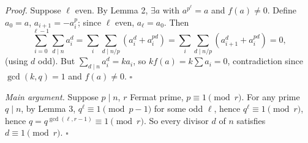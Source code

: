 \documentclass{article}
\begin{document}
\emph{Proof.} Suppose $\ell$ even. By Lemma 2, $\exists a$ with $a^{p^\ell} = a$ and $f(a) \neq 0$. Define $a_0 = a$, $a_{i+1} = -a_i^p$; since $\ell$ even, $a_\ell = a_0$. Then
\[
\sum_{i=0}^{\ell-1} \sum_{d \mid n} a_i^d = \sum_i \sum_{d \mid n/p} (a_i^d + a_i^{pd}) = \sum_i \sum_{d \mid n/p} (a_{i+1}^d + a_i^{pd}) = 0,
\]
(using $d$ odd). But $\sum_{d \mid n} a_i^d = k a_i$, so $k f(a) = k \sum a_i = 0$, contradiction since $\gcd(k, q) = 1$ and $f(a) \neq 0$. $\square$

\emph{Main argument.} Suppose $p \mid n$, $r$ Fermat prime, $p \equiv 1 \pmod r$. For any prime $q \mid n$, by Lemma 3, $q^\ell \equiv 1 \pmod{p-1}$ for some odd $\ell$, hence $q^\ell \equiv 1 \pmod r$, hence $q = q^{\gcd(\ell, r-1)} \equiv 1 \pmod r$. So every divisor $d$ of $n$ satisfies $d \equiv 1 \pmod r$. $\square$
\end{document}
